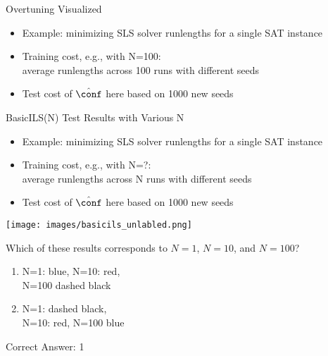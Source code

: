 \begin{frame}[fragile]{Overtuning Visualized}

\begin{itemize}
\item Example: minimizing SLS solver runlengths for a single SAT instance
\item \alert{Training cost}, e.g., with N=100:\\average runlengths across 100 runs with different seeds
\item \alert{Test cost} of $\hat{\conf}$ here based on 1000 new seeds 
\end{itemize}	

\pause


\begin{center}
\end{center}


\end{frame}

\begin{frame}[fragile]{BasicILS(N) Test Results with Various N}

\begin{itemize}
\item Example: minimizing SLS solver runlengths for a single SAT instance
\item \alert{Training cost}, e.g., with N=?:\\average runlengths across N runs with different seeds
\item \alert{Test cost} of $\hat{\conf}$ here based on 1000 new seeds 
\end{itemize}	

\pause

\begin{multicols}{2}
\begin{center}
\texttt{[image: images/basicils\_unlabled.png]}
\end{center}
\columnbreak{}
\pause
Which of these results corresponds to $N=1$, $N=10$, and $N=100$?\\
\hands

\pause
\medskip

\begin{enumerate}
\item N=1: blue, N=10: red,\\ N=100 dashed black
\item N=1: dashed black,\\ N=10: red, N=100 blue
\end{enumerate}

\pause
Correct Answer: 1


\end{multicols}


\end{frame}


